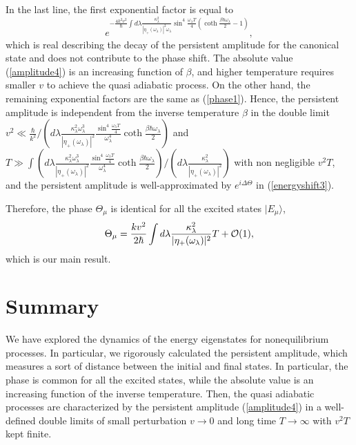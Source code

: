 \documentclass[aps,pre,twocolumn,eqsecnum,showpacs,superscriptaddress]{revtex4}
\begin{document}
In the last line, the first exponential factor is equal to 
\begin{equation}
e^{-\frac{4k^2v^2}{\hbar}\int d\lambda\frac{\kappa_\lambda^2}{|\eta_+(\omega_\lambda)|^2\omega_\lambda}\sin^4\frac{\omega_\lambda T}{4}(\coth\frac{\beta\hbar\omega_\lambda}{2}-1)}, \label{amplitude4}
\end{equation}
 which is real describing the decay of the persistent amplitude for the canonical state and does not contribute to the phase shift. The absolute value (\ref{amplitude4}) is an increasing function of $\beta$, and higher temperature requires smaller $v$ to achieve the quasi adiabatic process.
On the other hand, the remaining exponential factors are the same as (\ref{phase1}).
Hence, the persistent amplitude is independent from the inverse temperature $\beta$ in the double limit $v^2\ll\frac{\hbar}{k^2}/\left( d\lambda\frac{\kappa_\lambda^2\omega_\lambda^3}{|\eta_+(\omega_\lambda)|^2}\frac{\sin^4\frac{\omega_\lambda T}{4}}{\omega_\lambda^4}\coth\frac{\beta\hbar\omega_\lambda}{2}\right)$ and $T\gg\int\left( d\lambda\frac{\kappa_\lambda^2\omega_\lambda^3}{|\eta_+(\omega_\lambda)|^2}\frac{\sin^4\frac{\omega_\lambda T}{4}}{\omega_\lambda^4}\coth\frac{\beta\hbar\omega_\lambda}{2}\right)/\left(d\lambda\frac{\kappa_\lambda^2}{|\eta_+(\omega_\lambda)|^2}\right)$ with non negligible $v^2T$, and the  persistent amplitude is well-approximated by $e^{i\Delta \Theta}$ in (\ref{energyshift3}).      
  
Therefore, the phase $\Theta_\mu$ is identical for all the excited states $|E_\mu\rangle$,
\begin{equation}
\Theta_\mu=\frac{k v^2}{2\hbar}\int d\lambda\frac{\kappa_\lambda^2}{|\eta_+(\omega_\lambda)|^2}T+{\cal O}(1), \label{energyshift6}
\end{equation}
 which is our main result.     
\section{Summary}
We have explored the dynamics of the energy eigenstates for nonequilibrium processes.
In particular, we rigorously calculated the persistent amplitude, which measures a sort of distance between the initial and final states. 
In particular, the phase is common for all the excited states, while the absolute value is an increasing function of the inverse temperature.
Then, the quasi adiabatic processes are characterized by the persistent amplitude (\ref{amplitude4}) in a well-defined double limits of small perturbation $v\rightarrow 0$ and long time $T\rightarrow\infty$ with $v^2T$ kept finite.  
\end{document}
